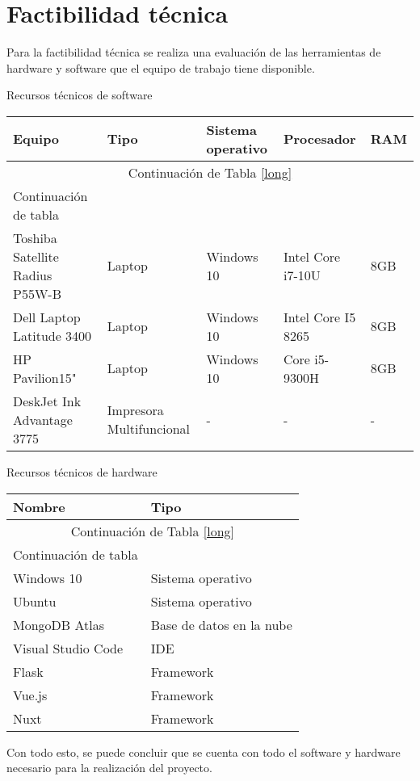 
\section{Factibilidad técnica}
Para la factibilidad técnica se realiza una evaluación de las herramientas de hardware  y software que el equipo de trabajo tiene disponible.


Recursos técnicos de software
\begin{longtable}{ p{3cm}| l | l | l | l }	
	
	\hline
	
	\textbf{Equipo } & \textbf{Tipo } & \textbf{Sistema operativo } & \textbf{Procesador } & \textbf{RAM } \\
	\hline
	\hline
	
	\endfirsthead
	
	\multicolumn{5}{c}{Continuación de Tabla \ref{long}}\\
	\hline
	Continuación de tabla\\
	\hline
	\endhead
	
	\hline
	\endfoot
	
	Toshiba Satellite Radius P55W-B & Laptop & Windows 10 & Intel Core i7-10U & 8GB\\
	Dell Laptop Latitude 3400 & Laptop & Windows 10 & Intel Core I5 8265 &  8GB\\
	HP Pavilion15" & Laptop & Windows 10 & Core i5-9300H &  8GB\\
	DeskJet Ink Advantage 3775  & Impresora Multifuncional & - & - & -\\
	
\end{longtable}


Recursos técnicos de hardware
\begin{longtable}{ l | l }	
	
	\hline
	
	\textbf{Nombre } & \textbf{Tipo } \\
	\hline
	\hline
	
	\endfirsthead
	
	\multicolumn{2}{c}{Continuación de Tabla \ref{long}}\\
	\hline
	Continuación de tabla\\
	\hline
	\endhead
	
	\hline
	\endfoot
	
	Windows 10 & Sistema operativo\\
	Ubuntu & Sistema operativo\\
	MongoDB Atlas & Base de datos en la nube\\
	Visual Studio Code & IDE\\
	Flask & Framework\\
	Vue.js & Framework\\
	Nuxt & Framework\\
	
\end{longtable}

Con todo esto, se puede concluir que se cuenta con todo el software y hardware necesario para la realización del proyecto.


